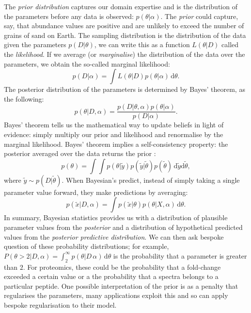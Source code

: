 \documentclass[12pt,english]{article}
\begin{document}
The \textit{prior distribution} captures our domain expertise and is the distribution of the parameters before any data is observed: $p(\theta|\alpha)$. The \textit{prior} could capture, say, that abundance values are positive and are unlikely to exceed the number of grains of sand on Earth. The sampling distribution is the distribution of the data given the parameters $p(D|\theta)$, we can write this as a function $L(\theta|D)$ called the \textit{likelihood}. If we average (or \textit{marginalise}) the distribution of the data over the parameters, we obtain the so-called marginal likelihood:
\begin{equation}
p(D|\alpha) = \int L(\theta|D)p(\theta|\alpha)\,\text{d}\theta.
\end{equation}
The posterior distribution of the parameters is determined by Bayes' theorem, as the following:
\begin{equation}
p(\theta|D, \alpha) = \frac{p(D|\theta, \alpha)p(\theta|\alpha)}{p(D|\alpha)}.
\end{equation}
Bayes' theorem tells us the mathematical way to update beliefs in light of evidence: simply multiply our prior and likelihood and renormalise by the marginal likelihood. Bayes' theorem implies a self-consistency property: the posterior averaged over the data returns the prior \citep{Talts::2018}:
\begin{equation}
p(\theta) = \int \int p(\theta|\tilde{y})p(\tilde{y}|\tilde{\theta})p(\tilde{\theta})\,\text{d}\tilde{y}\text{d}\tilde{\theta},
\end{equation}
where $\tilde{y} \sim p(D|\tilde{\theta})$. When Bayesian's predict, instead of simply taking a single parameter value forward, they make predictions by averaging:
\begin{equation}
p(\tilde{x}|D,\alpha) = \int p(\tilde{x}|\theta)p(\theta|X,\alpha)\,\text{d}\theta.
\end{equation}
In summary, Bayesian statistics provides us with a distribution of plausible parameter values from the \textit{posterior} and a distribution of hypothetical predicted values from the \textit{posterior predictive distribution}. We can then ask bespoke question of these probability distributions; for example, $P(\theta > 2|D, \alpha) = \int_{2}^{\infty}p(\theta|D\,\alpha)\,\text{d}\theta$ is the probability that a parameter is greater than $2$. For proteomics, these could be the probability that a fold-change exceeded a certain value or a the probability that a spectra belongs to a particular peptide. One possible interpretation of the prior is as a penalty that regularises the parameters, many applications exploit this and so can apply bespoke regularisation to their model. 
\end{document}
